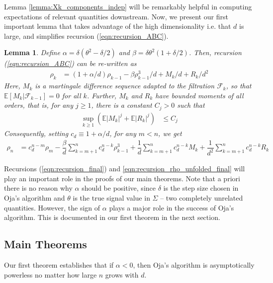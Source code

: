 \documentclass[12pt]{article}
\newtheorem{lemma}[theorem]{Lemma}      %
\def\gF{{\mathcal{F}}}
\newcommand{\E}{\mathbb{E}}
\begin{document}
 \medskip

Lemma \ref{lemma:Xk_components_indep} will be remarkably helpful in computing expectations of relevant quantities downstream. Now, we present our first important lemma that takes advantage of the high dimensionality i.e. that $d$ is large, and simplifies recursion (\ref{eqn:recursion_ABC}).

\begin{lemma}\label{lemma:main_recursion}
Define $\alpha=\delta(\theta^2-\delta/2)$ and $\beta=\delta\theta^2(1+\delta/2)$. Then, recursion (\ref{eqn:recursion_ABC}) can be re-written as
    \begin{align}\label{eqn:recursion_final}
      \rho_k &= (1 + \alpha/d)\rho_{k-1} - \beta\rho^3_{k-1}/d + M_k/d + R_k/d^2
    \end{align}
    Here, $M_k$ is a martingale difference sequence adapted to the filtration $\gF_k$, so that $\E[M_k|\gF_{k-1}]=0$ for all $k$. Further, $M_k$ and $R_k$ have bounded moments of all orders, that is, for any $j\geq 1$, there is a constant $C_j>0$ such that
    \begin{align*}
        \sup_{k\geq 1}(\E|M_k|^j + \E|R_k|^j) &\leq C_j
    \end{align*}Consequently, setting $c_d\equiv 1 + \alpha/d$, for any $m< n$, we get\begin{align}\label{eqn:recursion_rho_unfolded_final}
        \rho_n &= c_d^{n-m}\rho_m - \dfrac{\beta}{d}\sum_{k=m+1}^nc_d^{n-k}\rho^3_{k-1} + \dfrac{1}{d}\sum_{k=m+1}^n c_d^{n-k}M_k + \dfrac{1}{d^2}\sum_{k=m+1}^n c_d^{n-k}R_k
    \end{align}
\end{lemma}

\medskip

Recursions (\ref{eqn:recursion_final}) and \ref{eqn:recursion_rho_unfolded_final} will play an important role in the proofs of our main theorems. Note that a priori there is no reason why $\alpha$ should be positive, since $\delta$ is the step size chosen in Oja's algorithm and $\theta$ is the true signal value in $\Sigma$ -- two completely unrelated quantities. However, the sign of $\alpha$ plays a major role in the success of Oja's algorithm. This is documented in our first theorem in the next section.

\subsection{Main Theorems}

Our first theorem establishes that if $\alpha<0$, then Oja's algorithm is asymptotically powerless no matter how large $n$ grows with $d$.
\end{document}
